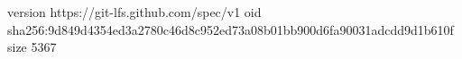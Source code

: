 version https://git-lfs.github.com/spec/v1
oid sha256:9d849d4354ed3a2780c46d8c952ed73a08b01bb900d6fa90031adcdd9d1b610f
size 5367
